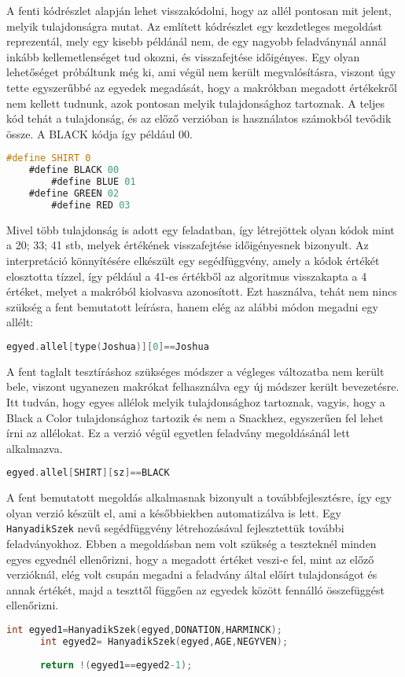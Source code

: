 \documentclass[12pt,a4paper,oneside]{report}
\begin{document}
	A fenti kódrészlet alapján lehet visszakódolni, hogy az allél pontosan mit jelent, melyik tulajdonságra mutat. Az említett kódrészlet egy kezdetleges megoldást reprezentál, mely egy kisebb példánál nem, de egy nagyobb feladványnál annál inkább kellemetlenséget tud okozni, és visszafejtése időigényes.
	Egy olyan lehetőséget próbáltunk még ki, ami végül nem került megvalósításra, viszont úgy tette egyszerűbbé az egyedek megadását, hogy a makrókban megadott értékekről nem kellett tudnunk,  azok pontosan melyik tulajdonsághoz tartoznak. A teljes kód tehát a tulajdonság, és az előző verzióban is használatos számokból tevődik össze. A BLACK kódja így például 00. 
	\begin{lstlisting}[frame=single, language=C]
	#define SHIRT 0
 	#define BLACK 00
    	#define BLUE 01
	#define GREEN 02
    	#define RED 03 
	\end{lstlisting}
			Mivel több tulajdonság is adott egy feladatban, így létrejöttek olyan kódok mint a 20; 33; 41 stb, melyek értékének visszafejtése időigényesnek bizonyult. Az interpretáció könnyítésére elkészült egy segédfüggvény, amely a kódok értékét elosztotta tízzel, így például a 41-es értékből az algoritmus visszakapta a 4 értéket, melyet a makróból kiolvasva azonosított. 
Ezt használva, tehát nem nincs szükség a fent bemutatott leírásra, hanem elég az alábbi módon megadni egy allélt:

	\begin{lstlisting}[frame=single, language=C]
	egyed.allel[type(Joshua)][0]==Joshua
	\end{lstlisting}


	A fent taglalt tesztíráshoz szükséges módszer a végleges változatba nem került bele, viszont ugyanezen makrókat felhasználva egy új módszer került bevezetésre. Itt tudván, hogy egyes allélok melyik tulajdonsághoz tartoznak, vagyis, hogy a Black a Color tulajdonsághoz tartozik és nem a Snackhez, egyszerűen fel lehet írni az allélokat. Ez a verzió végül egyetlen feladvány megoldásánál lett alkalmazva.
	\begin{lstlisting}[frame=single, language=C]
	egyed.allel[SHIRT][sz]==BLACK
	\end{lstlisting}

	A fent bemutatott megoldás alkalmasnak bizonyult a továbbfejlesztésre, így egy olyan verzió készült el, ami a későbbiekben automatizálva is lett. Egy \texttt{HanyadikSzek} nevű segédfüggvény létrehozásával fejlesztettük további feladványokhoz. Ebben a megoldásban nem volt szükség a teszteknél minden egyes egyednél ellenőrizni, hogy a megadott értéket veszi-e fel, mint az előző verzióknál, elég volt csupán megadni a feladvány által előírt tulajdonságot és annak értékét, majd a teszttől függően az egyedek között fennálló összefüggést ellenőrizni.
	\begin{lstlisting}[frame=single, language=C]
  	  int egyed1=HanyadikSzek(egyed,DONATION,HARMINCK);
   	  int egyed2= HanyadikSzek(egyed,AGE,NEGYVEN);
	
	  return !(egyed1==egyed2-1);
	\end{lstlisting}
\end{document}
